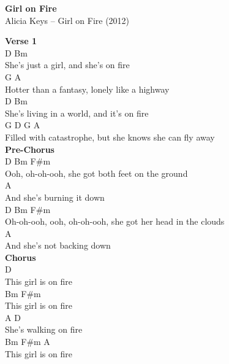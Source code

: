 \documentclass[a4paper]{article}
\begin{document}
    \begin{center}
        \textbf{Girl on Fire}
        ~\\
        Alicia Keys -- Girl on Fire (2012)
    \end{center}
    {
        \scriptsize
        \textbf{Verse 1}
        ~\\
        {
            \cutive
            \obeyspaces
D                                 Bm
\\
  She's just a girl, and she's on fire
\\
G                       A
\\
  Hotter than a fantasy, lonely like a highway
\\
D                                      Bm
\\
  She's living in a world, and it's on fire
\\
G               D         G                      A
\\
  Filled with catastrophe, but she knows she can fly away
\\

        }
        \textbf{Pre-Chorus}
        ~\\
        {
            \cutive
            \obeyspaces
D          Bm                              F\#m
\\
Ooh, oh-oh-ooh, she got both feet on the ground
\\
                      A
\\
And she's burning it down
\\
           D          Bm                             F\#m
\\
Oh-oh-ooh, ooh, oh-oh-ooh, she got her head in the clouds
\\
                       A
\\
And she's not backing down
\\

        }
        \textbf{Chorus}
        ~\\
        {
            \cutive
            \obeyspaces
                 D
\\
This girl is on fire
\\
Bm                 F\#m
\\
  This girl is on fire
\\
A                   D
\\
  She's walking on fire
\\
Bm                 F\#m  A
\\
  This girl is on fire
\\

}}
\end{document}
